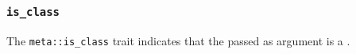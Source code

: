 
\subsubsection{\texttt{is\_class}}

The \texttt{meta::is\_class}
trait indicates that the  passed as argument is a .


